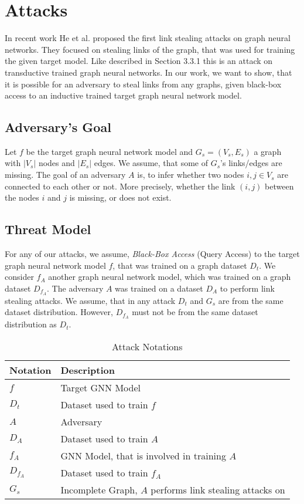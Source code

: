 \chapter{Attacks}

  In recent work He et al. \cite{DBLP:journals/corr/abs-2005-02131} proposed the first link stealing attacks on graph neural networks.
  They focused on stealing links of the graph, that was used for training the given target model.
  Like described in Section 3.3.1 this is an attack on transductive trained graph neural networks.
  In our work, we want to show, that it is possible for an adversary to steal links from any graphs, given black-box access to an inductive trained target graph neural network model.

  \section{Adversary's Goal}

    Let $f$ be the target graph neural network model and $G_s = (V_s, E_s)$ a graph with $|V_s|$ nodes and $|E_s|$ edges. 
    We assume, that some of $G_s$'s links/edges are missing.
    The goal of an adversary $A$ is, to infer whether two nodes $i,j \in V_s$ are connected to each other or not.
    More precisely, whether the link $(i,j)$ between the nodes $i$ and $j$ is missing, or does not exist.
  
  \section{Threat Model}

    For any of our attacks, we assume, \emph{Black-Box Access} (Query Access) to the target graph neural network model $f$, that was trained on a graph dataset $D_t$.
    We consider $f_A$ another graph neural network model, which was trained on a graph dataset $D_{f_A}$.
    The adversary $A$ was trained on a dataset $D_A$ to perform link stealing attacks.
    We assume, that in any attack $D_t$ and $G_s$ are from the same dataset distribution.
    However, $D_{f_A}$ must not be from the same dataset distribution as $D_t$.

    \begin{table}[!h]
      \centering
      \footnotesize
      \begin{tabular}{l|l|}
        \toprule
        Notation & Description \\
        \midrule
        $f$ & Target GNN Model \\
        $D_t$ & Dataset used to train $f$ \\
        $A$ & Adversary \\
        $D_A$ & Dataset used to train $A$ \\
        $f_A$ & GNN Model, that is involved in training $A$ \\
        $D_{f_A}$ & Dataset used to train $f_A$ \\
        $G_s$ & Incomplete Graph, $A$ performs link stealing attacks on\\
        \bottomrule
      \end{tabular}
      \caption{Attack Notations}
      \label{table:notations}
    \end{table}

